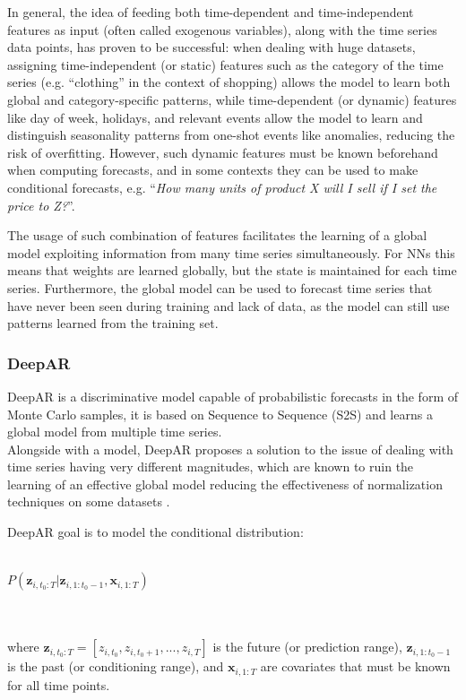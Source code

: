 \documentclass[a4paper, 12pt]{article} %
\begin{document}
	In general, the idea of feeding both time-dependent and time-independent features as input (often called exogenous variables), along with the time series data points, has proven to be successful: when dealing with huge datasets, assigning time-independent (or static) features such as the category of the time series (e.g. ``clothing'' in the context of shopping) allows the model to learn both global and category-specific patterns, while time-dependent (or dynamic) features like day of week, holidays, and relevant events allow the model to learn and distinguish seasonality patterns from one-shot events like anomalies, reducing the risk of overfitting. However, such dynamic features must be known beforehand when computing forecasts, and in some contexts they can be used to make conditional forecasts, e.g. ``\textit{How many units of product X will I sell if I set the price to Z?}''.
	
	The usage of such combination of features facilitates the learning of a global model exploiting information from many time series simultaneously. For NNs this means that weights are learned globally, but the state is maintained for each time series. Furthermore, the global model can be used to forecast time series that have never been seen during training and lack of data, as the model can still use patterns learned from the training set.
	
	
	
	
	\subsubsection{DeepAR } \label{sssec:deepar}
	DeepAR \cite{DeepAR} is a discriminative model capable of probabilistic forecasts in the form of Monte Carlo samples, it is based on Sequence to Sequence (S2S) \cite{seq2seq} and learns a global model from multiple time series.\\
	Alongside with a model, DeepAR proposes a solution to the issue of dealing with time series having very different magnitudes, which are known to ruin the learning of an effective global model reducing the effectiveness of normalization techniques on some datasets \cite{DeepAR}.
	
	DeepAR goal is to model the conditional distribution:\\\\
	\centerline{
	$
	P(\pmb{z}_{i, t_0:T} | \pmb{z}_{i, 1:t_0-1}, \pmb{x}_{i, 1:T})
	$
	}\\\\
	where $\pmb{z}_{i, t_0:T} = [z_{i,t_0}, z_{i, t_0+1}, ..., z_{i, T}]$ is the future (or prediction range), $\pmb{z}_{i, 1:t_0-1}$ is the past (or conditioning range), and $\pmb{x}_{i, 1:T}$ are covariates that must be known for all time points.
	
\end{document}
